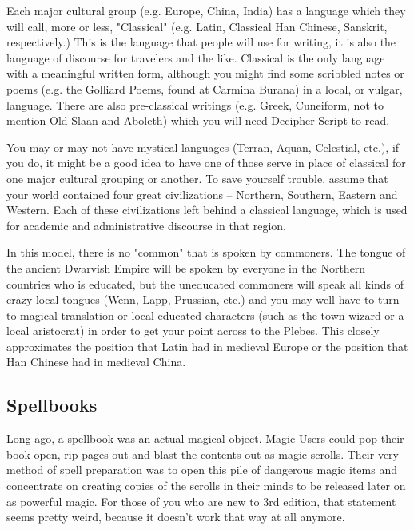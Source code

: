 Each major cultural group (e.g. Europe, China, India) has a language which they will call, more or less, "Classical" (e.g. Latin, Classical Han Chinese, Sanskrit, respectively.) This is the language that people will use for writing, it is also the language of discourse for travelers and the like. Classical is the only language with a meaningful written form, although you might find some scribbled notes or poems (e.g. the Golliard Poems, found at Carmina Burana) in a local, or vulgar, language. There are also pre-classical writings (e.g. Greek, Cuneiform, not to mention Old Slaan and Aboleth) which you will need Decipher Script to read.

You may or may not have mystical languages (Terran, Aquan, Celestial, etc.), if you do, it might be a good idea to have one of those serve in place of classical for one major cultural grouping or another. To save yourself trouble, assume that your world contained four great civilizations -- Northern, Southern, Eastern and Western. Each of these civilizations left behind a classical language, which is used for academic and administrative discourse in that region.

In this model, there is no "common" that is spoken by commoners. The tongue of the ancient Dwarvish Empire will be spoken by everyone in the Northern countries who is educated, but the uneducated commoners will speak all kinds of crazy local tongues (Wenn, Lapp, Prussian, etc.) and you may well have to turn to magical translation or local educated characters (such as the town wizard or a local aristocrat) in order to get your point across to the Plebes. This closely approximates the position that Latin had in medieval Europe or the position that Han Chinese had in medieval China.

\subsection{Spellbooks}
\vspace*{-8pt}

Long ago, a spellbook was an actual magical object. Magic Users could pop their book open, rip pages out and blast the contents out as magic scrolls. Their very method of spell preparation was to open this pile of dangerous magic items and concentrate on creating copies of the scrolls in their minds to be released later on as powerful magic. For those of you who are new to 3rd edition, that statement seems pretty weird, because it doesn't work that way at all anymore.

